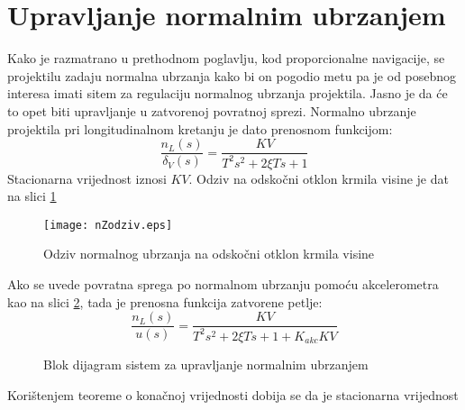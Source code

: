 \section{Upravljanje normalnim ubrzanjem}
Kako je razmatrano u prethodnom poglavlju, kod proporcionalne navigacije, se projektilu 
zadaju normalna ubrzanja kako bi on pogodio metu pa je od posebnog interesa imati sitem 
za regulaciju normalnog ubrzanja projektila. Jasno je da će to opet biti upravljanje u 
zatvorenoj povratnoj sprezi. Normalno ubrzanje projektila pri longitudinalnom kretanju 
je dato prenosnom funkcijom:
\begin{equation}
    \frac{n_L(s)}{\delta_V(s)}=\frac{KV}{T^2s^2+2\xi Ts+1}
\end{equation}
Stacionarna vrijednost iznosi $KV$. Odziv na odskočni otklon krmila visine je dat 
na slici \ref{fig:nLodziv}
\begin{figure}[!ht]
    \centering
    \texttt{[image: nZodziv.eps]}
    \caption{Odziv normalnog ubrzanja na odskočni otklon krmila visine}
    \label{fig:nLodziv}
\end{figure}
Ako se uvede povratna sprega po normalnom ubrzanju pomoću akcelerometra kao na slici \ref{fig:akcLoop},
tada je prenosna funkcija zatvorene petlje:
\begin{equation}
    \frac{n_L(s)}{u(s)} = \frac{KV}{T^2s^2+2\xi Ts + 1 +K_{akc}KV}
\end{equation}
\begin{figure}[!ht]
    \centering
    \caption{Blok dijagram sistem za upravljanje normalnim ubrzanjem}
    \label{fig:akcLoop}
\end{figure}
Korištenjem teoreme o konačnoj vrijednosti dobija se da je stacionarna vrijednost 
